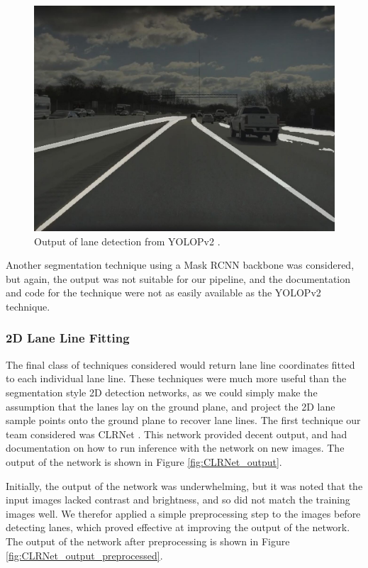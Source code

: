 \begin{figure}
    \centering
    \includegraphics[width=0.9\linewidth]{images/YOLOPv2.jpg}
    \caption{Output of lane detection from YOLOPv2 \cite{YOLOPv2}.}
    \label{fig:YOLOPv2_output}
\end{figure}

Another segmentation technique using a Mask RCNN backbone was considered, but again, the output was not suitable for our pipeline, and the documentation and code for the technique were not as easily available as the YOLOPv2 technique. 


\subsubsection{2D Lane Line Fitting}
The final class of techniques considered would return lane line coordinates fitted to each individual lane line. These techniques were much more useful than the segmentation style 2D detection networks, as we could simply make the assumption that the lanes lay on the ground plane, and project the 2D lane sample points onto the ground plane to recover lane lines. The first technique our team considered was CLRNet \cite{CLRNet}. This network provided decent output, and had documentation on how to run inference with the network on new images. The output of the network is shown in Figure \ref{fig:CLRNet_output}.

Initially, the output of the network was underwhelming, but it was noted that the input images lacked contrast and brightness, and so did not match the training images well. We therefor applied a simple preprocessing step to the images before detecting lanes, which proved effective at improving the output of the network. The output of the network after preprocessing is shown in Figure \ref{fig:CLRNet_output_preprocessed}.

